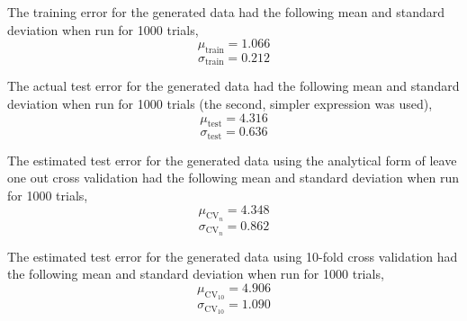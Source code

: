 \documentclass[12pt,twoside]{article}
\begin{document}
\begin{problems}
\begin{problemparts}
\end{problemparts}

\newpage

\problem  %

\begin{problemparts}

\problempart %

\problempart %

\problempart %

\problempart %

\problempart %

\end{problemparts}

\newpage

\problem  %

\begin{problemparts}

\problempart %

The training error for the generated data had the following mean and standard
deviation when run for 1000 trials,
$$ \mu_{\mathrm{train}} = 1.066 $$
$$ \sigma_{\mathrm{train}} = 0.212 $$

\problempart %

The actual test error for the generated data had the following mean and standard 
deviation when run for 1000 trials (the second, simpler expression was used),
$$ \mu_{\mathrm{test}} = 4.316 $$
$$ \sigma_{\mathrm{test}} = 0.636 $$

\problempart %

The estimated test error for the generated data using the analytical form of leave 
one out cross validation had the following mean and standard deviation when run 
for 1000 trials,
$$ \mu_{\mathrm{CV}_n} = 4.348 $$
$$ \sigma_{\mathrm{CV}_n} = 0.862 $$

\problempart %

The estimated test error for the generated data using 10-fold cross validation
had the following mean and standard deviation when run for 1000 trials,
$$ \mu_{\mathrm{CV}_{10}} = 4.906 $$
$$ \sigma_{\mathrm{CV}_{10}} = 1.090 $$

\end{problemparts}

\newpage

\problem  %

\begin{problemparts}


\end{problemparts}
\end{problems}
\end{document}
